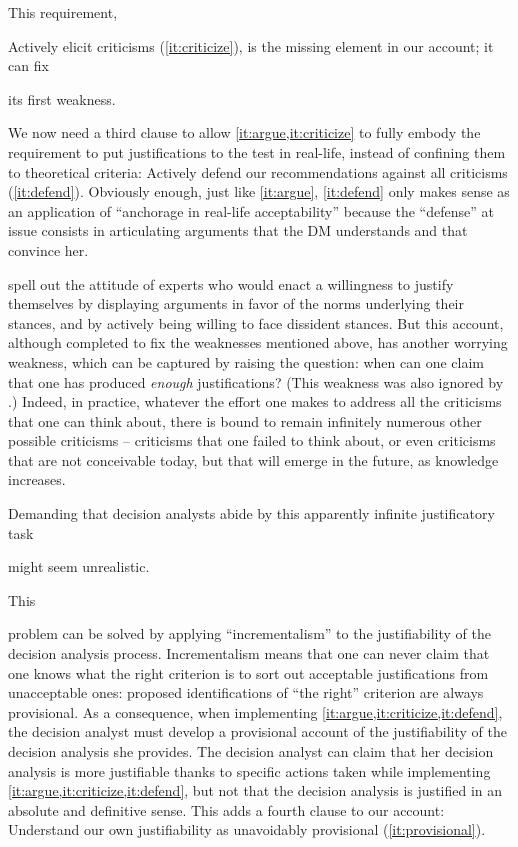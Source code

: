 \documentclass[preprint, french, english, 11pt, authoryear]{elsarticle}%
\begin{document}
This requirement, \begin{changebar}Actively elicit criticisms (\ref{it:criticize}), is the missing element in our account; it can fix\end{changebar} its first weakness.

We now need a third clause to allow \cref{it:argue,it:criticize} to fully embody the requirement to put justifications to the test in real-life, instead of confining them to theoretical criteria: Actively defend our recommendations against all criticisms (\ref{it:defend}).
Obviously enough, just like \cref{it:argue}, \cref{it:defend} only makes sense as an application of ``anchorage in real-life acceptability'' because the ``defense'' at issue consists in articulating arguments that the \ac{DM} understands and that convince her.

 spell out the attitude of experts who would enact a willingness to justify themselves by displaying arguments in favor of the norms underlying their stances, and by actively being willing to face dissident stances. 
But this account, although completed to fix the weaknesses mentioned above, has another worrying weakness, which can be captured by raising the question: when can one claim that one has produced \emph{enough} justifications? (This weakness was also ignored by  \citet{meinard_what_2017}.) 
Indeed, in practice, whatever the effort one makes to address all the criticisms that one can think about, there is bound to remain infinitely numerous other possible criticisms -- criticisms that one failed to think about, or even criticisms that are not conceivable today, but that will emerge in the future, as knowledge increases. 
\begin{changebar}Demanding that decision analysts abide by this apparently infinite justificatory task\end{changebar} might seem unrealistic. 

This \begin{changebar}problem can be solved by applying ``incrementalism'' to the justifiability of the decision analysis process. 
Incrementalism means that one can never claim that one knows what the right criterion is to sort out acceptable justifications from unacceptable ones: proposed identifications of ``the right'' criterion are always provisional. 
As a consequence, when implementing \cref{it:argue,it:criticize,it:defend}, the decision analyst must develop a provisional account of the justifiability of the decision analysis she provides. 
The decision analyst can claim that her decision analysis is more justifiable thanks to specific actions taken while implementing \cref{it:argue,it:criticize,it:defend}, but not that the decision analysis is justified in an absolute and definitive sense. 
This adds a fourth clause to our account: Understand our own justifiability as unavoidably provisional (\ref{it:provisional}).\end{changebar}
\end{document}
